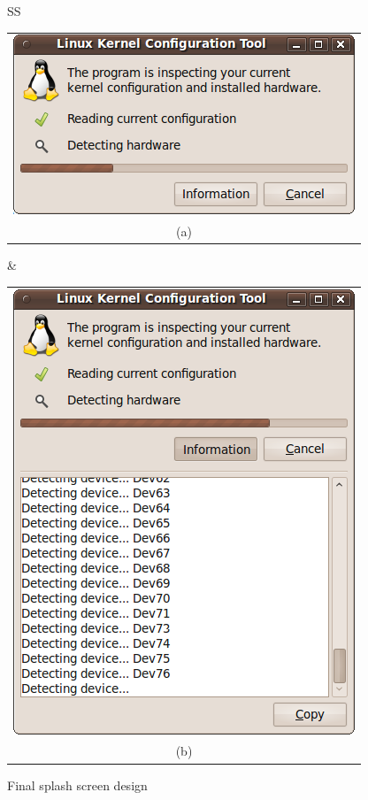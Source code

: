 \documentclass{chi2009}
\begin{document}
\begin{figure}[!t]
 \centering
\begin{tabular}{SS}
 \begin{tabular}{c}
  \includegraphics[scale=0.5,keepaspectratio=true]{figs/splash-final1} \\
  (a) \\
 \end{tabular}
  & 
\begin{tabular}{c}
  \includegraphics[scale=0.5,keepaspectratio=true]{figs/splash-final2} \\
  (b) \\
 \end{tabular}
\end{tabular}
\caption{Final splash screen design}
\label{fig:splash-final}
\end{figure}
\end{document}
